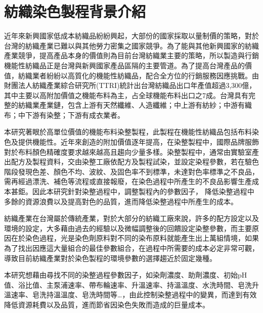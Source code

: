 \chapter{紡織染色製程背景介紹}
\label{c:intro} %
近年來新興國家低成本紡織品紛紛興起，大部份的國家採取以量制價的策略，對於台灣的紡織產業已難以與其他勞力密集之國家競爭。為了能與其他新興國家的紡織產業競爭，提高產品本身的價值則為目前台灣紡織業主要的策略，所以製造與行銷機能性紡織品正是台灣與新興國家產品區隔的主要管道。為了提高台灣產品的價值，紡織業者紛紛以高質化的機能性紡織品，配合全方位的行銷服務因應挑戰。由財團法人紡織產業綜合研究所(TTRI)統計出台灣紡織品出口年產值超過3,300億，其中主要以高附加價值之機能布料為主，占全球機能布料出口之7成。台灣具有完整的紡織業產業鏈，包含上游有天然纖維、人造纖維；中上游有紡紗；中游有織布；中下游有染整；下游有成衣業者。

本研究著眼於高單位價值的機能布料染整製程，此製程在機能性紡織品包括布料染色及提供機能性。近年來創造的附加價值逐年提高，在染整製程中，國際品牌服飾對於布料顏色精確度要求越來越高且趨向少量多樣。染整製程中，通常由實驗室產出配方及製程資料，交由染整工廠依配方及製程試染，並設定染程參數，若在驗色階段發現色差、顏色不均、波紋、及固色率不到標準，未達對色率標準之不良品，需再經過漂洗、補色等流程或直接報廢，在染色過程中所產生的不良品影響生產成本甚鉅。因此本研究針對染整過程中，調整製程內的參數因子，
降低染整過程中多餘的資源浪費以及提高對色的品質，進而降低染整過程中所產生的成本。

紡織產業在台灣屬於傳統產業，對於大部分的紡織工廠來說，許多的配方設定以及環境的設定，大多藉由過去的經驗以及微幅調整後的回饋設定染整參數，而主要原因在於染色過程，光是染色劑原料對不同的染布原料就能產生出上萬組情境，如果為了找出因應這大量組合的最佳參數組合，在過程中所需要的成本必定非常可觀，導致目前紡織產業對於染色製程的環境參數的選擇趨近於固定幾種。

本研究想藉由尋找不同的染整過程參數因子，如染劑濃度、助劑濃度、初始pH值、浴比值、主泵浦速率、帶布輪速率、升溫速率、持溫溫度、水洗時間、皂洗升溫速率、皂洗持溫溫度、皂洗時間等\dots，由此控制染整過程中的變異，而達到有效降低資源耗費以及品質，進而節省因染色失敗而造成的巨量成本。


